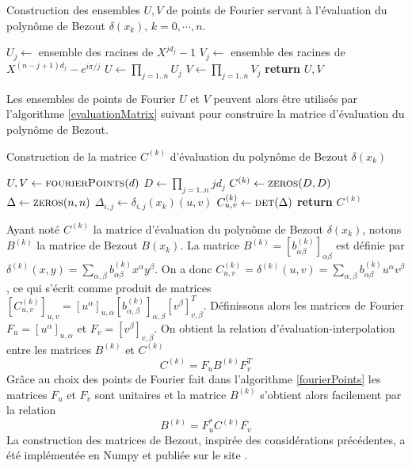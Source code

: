 \documentclass{standalone}
\begin{document}
\begin{algorithm}
\caption{Construction des ensembles $U, V$ de points de Fourier servant à l'évaluation du polynôme de Bezout $\delta(x_k)$, $k = 0, \cdots, n$.}
\label{fourierPoints}
\begin{algorithmic}
 
 
\State $U_j \gets$ ensemble des racines de $X^{jd_j}-1$
\State $V_j \gets$ ensemble des racines de $X^{(n-j+1)d_j}-e^{i\pi/j}$
\EndFor
\State $U \gets \prod_{j=1..n}U_j$
\State $V \gets \prod_{j=1..n}V_j$
\State \textbf{return} $U, V$
\EndFunction
\end{algorithmic}
\end{algorithm}
Les ensembles de points de Fourier $U$ et $V$ peuvent alors être utilisés par l'algorithme \ref{evaluationMatrix} suivant pour construire la matrice d'évaluation du polynôme de Bezout.
\begin{algorithm}[H]
\caption{Construction de la matrice $C^{(k)}$ d'évaluation du polynôme de Bezout $\delta(x_k)$}
\label{evaluationMatrix}
\begin{algorithmic}
 
\State $U, V \gets \textsc{fourierPoints}(d)$ 
\State $D \gets \prod_{j=1..n}jd_j$
\State $C^{(k)} \gets \textsc{zeros}(D, D)$
      \State $\Delta \gets \textsc{zeros}(n, n)$
      		\State $\Delta_{i,j} \gets \delta_{i,j}(x_k)(u, v)$ 
   		\EndFor
		\State $C^{(k)}_{u, v} \gets \textsc{det}(\Delta)$
	\EndFor
\State \textbf{return} $C^{(k)}$
\EndFunction
\end{algorithmic}
\end{algorithm}
Ayant noté $C^{(k)}$ la matrice d'évaluation du polynôme de Bezout $\delta(x_k)$, notons $B^{(k)}$ la matrice de Bezout $B(x_k)$.
La matrice $B^{(k)} = \left[b^{(k)}_{\alpha\beta}\right]_{\alpha\beta}$ est définie par $\delta^{(k)}(x, y) = \sum_{\alpha,\beta} b^{(k)}_{\alpha\beta} x^\alpha y^\beta$. On a donc $C^{(k)}_{u,v} = \delta^{(k)}(u, v) = \sum_{\alpha,\beta} b^{(k)}_{\alpha\beta} u^\alpha v^\beta$, ce qui s'écrit comme produit de matrices
$\left[C^{(k)}_{u,v}\right]_{u,v} = \left[u^\alpha\right]_{u,\alpha} \left[b^{(k)}_{\alpha,\beta}\right]_{\alpha, \beta} \left[v^\beta\right]_{v, \beta}^T$. Définissons alors les matrices de Fourier $F_u = \left[ u^\alpha \right]_{u, \alpha}$
 et $F_v = \left[ v^\beta \right]_{v, \beta}$. On obtient la relation d'évaluation-interpolation entre les matrices $B^{(k)}$ et $C^{(k)}$
$$C^{(k)} = F_uB^{(k)} F_v^T$$
 Grâce au choix des points de Fourier fait dans l'algorithme \ref{fourierPoints} les matrices $F_u$ et $F_v$ sont unitaires et la matrice $B^{(k)}$ s'obtient alors facilement par la relation
 \begin{equation}
 B^{(k)} = F_u^*C^{(k)} \overline{F_v}
 \end{equation}
La construction des matrices de Bezout, inspirée des considérations précédentes, a été implémentée en Numpy et publiée sur le site \cite{jp_code}.
\end{document}
